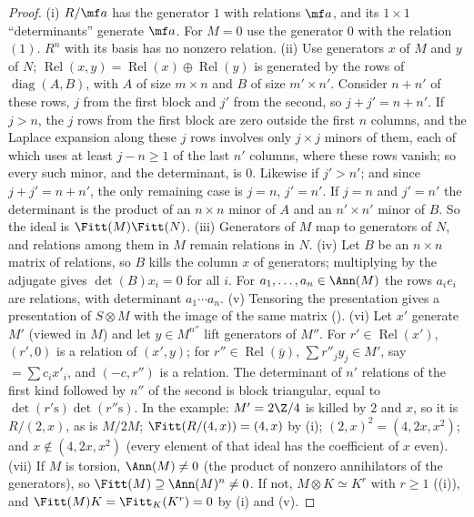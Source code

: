 \begin{proof}
(i) $R/\mf a$ has the generator $1$ with relations $\mf a$, and its $1\times1$ ``determinants'' generate $\mf a$. For $M=0$ use the generator $0$ with
the relation $(1)$. $R^n$ with its basis has no nonzero relation.
(ii) Use generators $x$ of $M$ and $y$ of $N$; $\operatorname{Rel}(x,y)=\operatorname{Rel}(x)\oplus\operatorname{Rel}(y)$ is generated by the rows of $\operatorname{diag}(A,B)$, with $A$ of size $m\times n$ and $B$ of
size $m'\times n'$. Consider $n+n'$ of these rows, $j$ from the first block and $j'$ from the second, so $j+j'=n+n'$. If $j>n$, the $j$ rows from
the first block are zero outside the first $n$ columns, and the Laplace expansion along these $j$ rows involves only $j\times j$ minors of them, each of which uses at least $j-n\ge1$ of the last $n'$
columns, where these rows vanish; so every such minor, and the determinant, is $0$. Likewise if $j'>n'$; and since $j+j'=n+n'$, the only
remaining case is $j=n$, $j'=n'$. If $j=n$ and $j'=n'$ the determinant is the product of an $n\times n$ minor of $A$ and an $n'\times n'$ minor of $B$. So the ideal is
$\Fitt(M)\Fitt(N)$.
(iii) Generators of $M$ map to generators of $N$, and relations among them in $M$ remain relations in $N$.
(iv) Let $B$ be an $n\times n$ matrix of relations, so $B$ kills the column $x$ of generators; multiplying by the adjugate gives
$\det(B)x_i=0$ for all $i$. For $a_1,\dots,a_n\in\Ann(M)$ the rows $a_ie_i$ are relations, with determinant $a_1\cdots a_n$.
(v) Tensoring the presentation gives a presentation of $S\otimes M$ with the image of the same matrix ().
(vi) Let $x'$ generate $M'$ (viewed in $M$) and let $y\in M^{n''}$ lift generators of $M''$. For $r'\in\operatorname{Rel}(x')$, $(r',0)$ is a relation of $(x',y)$; for
$r''\in\operatorname{Rel}(\bar y)$, $\sum r''_jy_j\in M'$, say $=\sum c_ix'_i$, and $(-c,r'')$ is a relation. The determinant of $n'$ relations of the first kind followed by $n''$
of the second is block triangular, equal to $\det(r'\text{s})\det(r''\text{s})$. In the example: $M'=2\Z/4$ is killed by $2$ and $x$, so it is $R/(2,x)$, as is
$M/2M$; $\Fitt(R/(4,x))=(4,x)$ by (i); $(2,x)^2=(4,2x,x^2)$; and $x\notin(4,2x,x^2)$ (every element of that ideal has the coefficient of $x$ even).
(vii) If $M$ is torsion, $\Ann(M)\ne0$ (the product of nonzero annihilators of the generators), so $\Fitt(M)\supseteq\Ann(M)^n\ne0$. If not, $M\otimes K\simeq K^r$
with $r\ge1$ ((i)), and $\Fitt(M)K=\Fitt_K(K^r)=0$ by (i) and (v).
\end{proof}

